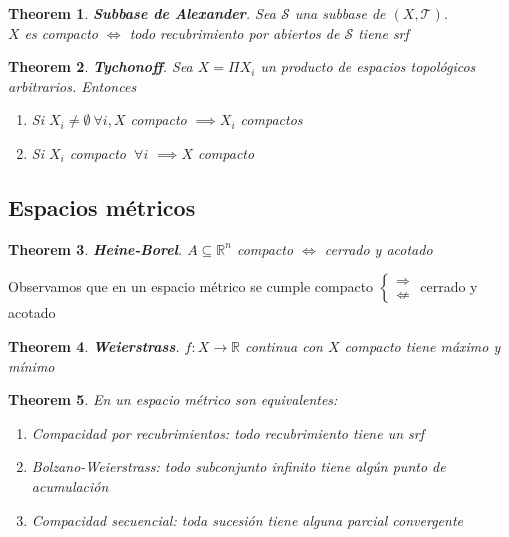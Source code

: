 \documentclass{myclass}
\newtheorem*{theorem}{Theorem}
\begin{document}
\begin{theorem}
\textbf{Subbase de Alexander}. Sea $\mathcal{S}$ una subbase de $(X, \mathcal{T})$. \\
$X$ es compacto $\iff$ todo recubrimiento por abiertos de $\mathcal{S}$ tiene srf
\end{theorem}

\begin{theorem} \textbf{Tychonoff}. 
Sea $X=\Pi X_i$ un producto de espacios topológicos arbitrarios. Entonces
\begin{enumerate}[topsep=-6pt, itemsep=0pt]
  \item Si $X_i \neq \emptyset \ \forall i, X$ compacto $\implies X_i$ compactos
  \item Si $X_i$ compacto $\ \forall i$ $\implies X$ compacto
\end{enumerate}
\end{theorem}


\subsection{Espacios métricos}
\begin{theorem}
\textbf{Heine-Borel}. $A\subseteq \mathbb{R}^n$ compacto $\iff$ cerrado y acotado
\end{theorem}
Observamos que en un espacio métrico se cumple compacto $\begin{cases}
  \Rightarrow \\ \not\Leftarrow 
\end{cases}$ cerrado y acotado

\begin{theorem}
\textbf{Weierstrass}. $f:X \to \mathbb{R}$ continua con $X$ compacto tiene máximo y mínimo
\end{theorem}

\begin{theorem}
  En un espacio métrico son equivalentes:
  \begin{enumerate}[topsep=-6pt, itemsep=0pt]
    \item \textit{Compacidad por recubrimientos}: todo recubrimiento tiene un srf 
	\item \textit{Bolzano-Weierstrass}: todo subconjunto infinito tiene algún punto de acumulación
	\item \textit{Compacidad secuencial}: toda sucesión tiene alguna parcial convergente
  \end{enumerate}
\end{theorem}
\end{document}
